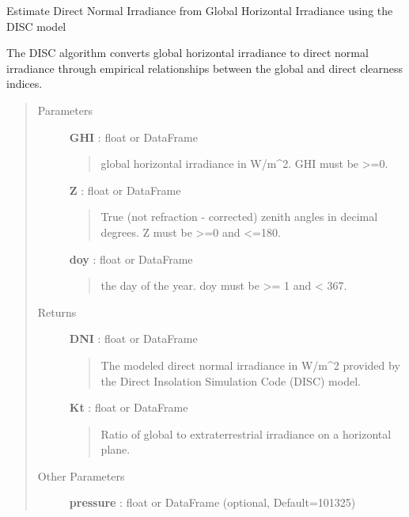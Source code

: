 \documentclass[letterpaper,10pt,english]{sphinxmanual}
\begin{document}
\begin{fulllineitems}
\label{stubs/pvlib.pvl_disc:pvlib.pvl_disc}
Estimate Direct Normal Irradiance from Global Horizontal Irradiance using the DISC model

The DISC algorithm converts global horizontal irradiance to direct
normal irradiance through empirical relationships between the global
and direct clearness indices.
\begin{quote}\begin{description}
\item[{Parameters}] \leavevmode
\textbf{GHI} : float or DataFrame
\begin{quote}

global horizontal irradiance in W/m\textasciicircum{}2. GHI must be \textgreater{}=0.
\end{quote}

\textbf{Z} : float or DataFrame
\begin{quote}

True (not refraction - corrected) zenith angles in decimal degrees. 
Z must be \textgreater{}=0 and \textless{}=180.
\end{quote}

\textbf{doy} : float or DataFrame
\begin{quote}

the day of the year. doy must be \textgreater{}= 1 and \textless{} 367.
\end{quote}

\item[{Returns}] \leavevmode
\textbf{DNI} : float or DataFrame
\begin{quote}

The modeled direct normal irradiance in W/m\textasciicircum{}2 provided by the
Direct Insolation Simulation Code (DISC) model.
\end{quote}

\textbf{Kt} : float or DataFrame
\begin{quote}

Ratio of global to extraterrestrial irradiance on a horizontal plane.
\end{quote}

\item[{Other Parameters}] \leavevmode
\textbf{pressure} : float or DataFrame (optional, Default=101325)
\begin{quote}


\end{quote}
\end{description}
\end{quote}
\end{fulllineitems}
\end{document}
